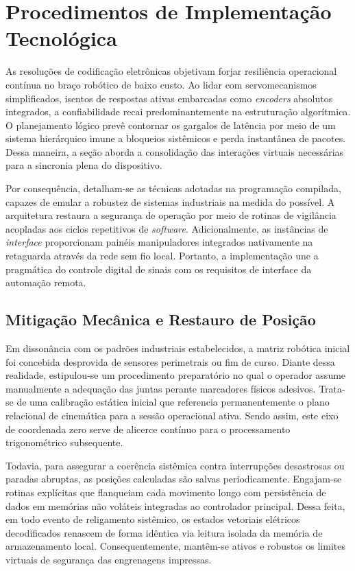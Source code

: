 \section{Procedimentos de Implementação Tecnológica}

As resoluções de codificação eletrônicas objetivam forjar resiliência operacional contínua no braço robótico de baixo custo. Ao lidar com servomecanismos simplificados, isentos de respostas ativas embarcadas como \textit{encoders} absolutos integrados, a confiabilidade recai predominantemente na estruturação algorítmica. O planejamento lógico prevê contornar os gargalos de latência por meio de um sistema hierárquico imune a bloqueios sistêmicos e perda instantânea de pacotes. Dessa maneira, a seção aborda a consolidação das interações virtuais necessárias para a sincronia plena do dispositivo.

Por consequência, detalham-se as técnicas adotadas na programação compilada, capazes de emular a robustez de sistemas industriais na medida do possível. A arquitetura restaura a segurança de operação por meio de rotinas de vigilância acopladas aos ciclos repetitivos de \textit{software}. Adicionalmente, as instâncias de \textit{interface} proporcionam painéis manipuladores integrados nativamente na retaguarda através da rede sem fio local. Portanto, a implementação une a pragmática do controle digital de sinais com os requisitos de interface da automação remota.

\subsection{Mitigação Mecânica e Restauro de Posição}

Em dissonância com os padrões industriais estabelecidos, a matriz robótica inicial foi concebida desprovida de sensores perimetrais ou fim de curso. Diante dessa realidade, estipulou-se um procedimento preparatório no qual o operador assume manualmente a adequação das juntas perante marcadores físicos adesivos. Trata-se de uma calibração estática inicial que referencia permanentemente o plano relacional de cinemática para a sessão operacional ativa. Sendo assim, este eixo de coordenada zero serve de alicerce contínuo para o processamento trigonométrico subsequente.

Todavia, para assegurar a coerência sistêmica contra interrupções desastrosas ou paradas abruptas, as posições calculadas são salvas periodicamente. Engajam-se rotinas explícitas que flanqueiam cada movimento longo com persistência de dados em memórias não voláteis integradas ao controlador principal. Dessa feita, em todo evento de religamento sistêmico, os estados vetoriais elétricos decodificados renascem de forma idêntica via leitura isolada da memória de armazenamento local. Consequentemente, mantêm-se ativos e robustos os limites virtuais de segurança das engrenagens impressas.

